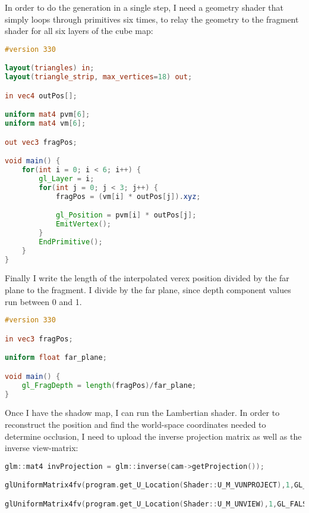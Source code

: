 In order to do the generation in a single step, I need a geometry shader that simply loops through primitives six times, to relay the geometry to the fragment shader for all six layers of the cube map:
\begin{lstlisting}[caption={shadow\_gen.geom},language=GLSL]
#version 330

layout(triangles) in;
layout(triangle_strip, max_vertices=18) out;

in vec4 outPos[];

uniform mat4 pvm[6];
uniform mat4 vm[6];

out vec3 fragPos;

void main() {
	for(int i = 0; i < 6; i++) {
		gl_Layer = i;
		for(int j = 0; j < 3; j++) {
			fragPos = (vm[i] * outPos[j]).xyz;

			gl_Position = pvm[i] * outPos[j];
			EmitVertex();
		}
		EndPrimitive();
	}
}
\end{lstlisting}

Finally I write the length of the interpolated verex position divided by the far plane to the fragment. I divide by the far plane, since depth component values run between 0 and 1.
\begin{lstlisting}[caption={shadow\_gen.frag},language=GLSL]
#version 330

in vec3 fragPos;

uniform float far_plane;

void main() {
	gl_FragDepth = length(fragPos)/far_plane;
}
\end{lstlisting}

Once I have the shadow map, I can run the Lambertian shader. In order to reconstruct the position and find the world-space coordinates needed to determine occlusion, I need to upload the inverse projection matrix as well as the inverse view-matrix:
\begin{lstlisting}[caption={Filters.cpp},language=c++]
glm::mat4 invProjection = glm::inverse(cam->getProjection());

glUniformMatrix4fv(program.get_U_Location(Shader::U_M_VUNPROJECT),1,GL_FALSE,glm::value_ptr(invProjection));

glUniformMatrix4fv(program.get_U_Location(Shader::U_M_UNVIEW),1,GL_FALSE,glm::value_ptr(glm::inverse(cam->getLookAt())));
\end{lstlisting}

